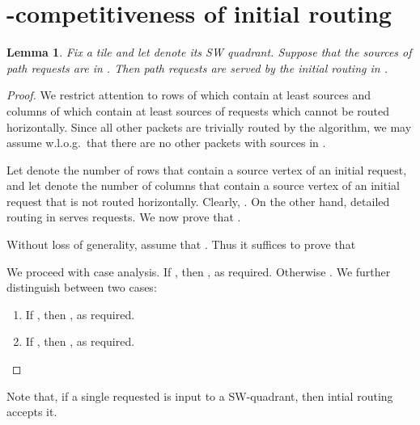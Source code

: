 \documentclass[11pt]{article}
\newtheorem{lemma}[theorem]{Lemma}
\newenvironment{proof sketch}[1]{\noindent {\emph{Proof sketch of #1:}}}{\hfill \qed}
\begin{document}
\section{-competitiveness of initial routing}
\begin{lemma}\label{lemma:SW}
  Fix a tile  and let  denote its SW quadrant.
  Suppose that the sources of   path requests are in . Then
   path requests are served by the initial
  routing in .
\end{lemma}
\begin{proof}
We restrict attention to rows of  which contain at least 
  sources and  columns of  which contain at least  sources of requests
  which cannot be
  routed horizontally. Since all other packets are trivially routed by the
  algorithm, we may assume w.l.o.g.\ that there are no other packets
  with sources in .


{Let  denote the number of rows that contain a source vertex of
  an initial request, and let  denote the number of columns that
  contain a source vertex of an initial request that is not routed
  horizontally.}
  Clearly, . On the other hand, detailed routing in
   serves  requests. We now prove that .

Without loss of generality, assume that
  . Thus it suffices to prove that



We proceed with case analysis.  If , then , as
  required.
Otherwise .  We further distinguish between two cases:
  \begin{enumerate}
  \item If , then , as required.
  \item If , then , as
      required.
  \end{enumerate}
\end{proof}

Note that, if a single requested is input to a SW-quadrant,
then intial routing accepts it.
\end{document}
